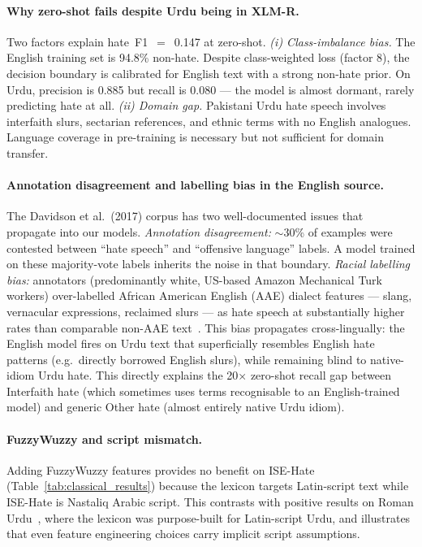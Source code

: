 \documentclass{article}
\begin{document}
\paragraph{Why zero-shot fails despite Urdu being in XLM-R.}
Two factors explain hate~F1~$=$~0.147 at zero-shot.
\textit{(i) Class-imbalance bias.}
The English training set is 94.8\% non-hate.
Despite class-weighted loss (factor 8), the decision boundary is
calibrated for English text with a strong non-hate prior.
On Urdu, precision is 0.885 but recall is 0.080 --- the model is
almost dormant, rarely predicting hate at all.
\textit{(ii) Domain gap.}
Pakistani Urdu hate speech involves interfaith slurs, sectarian references,
and ethnic terms with no English analogues.
Language coverage in pre-training is necessary but not sufficient for
domain transfer.

\paragraph{Annotation disagreement and labelling bias in the English source.}
The Davidson et al.\ (2017) corpus has two well-documented issues that
propagate into our models.
\textit{Annotation disagreement:} $\sim$30\% of examples were contested
between ``hate speech'' and ``offensive language'' labels.
A model trained on these majority-vote labels inherits the noise in that
boundary.
\textit{Racial labelling bias:} annotators (predominantly white, US-based
Amazon Mechanical Turk workers) over-labelled African American English (AAE)
dialect features --- slang, vernacular expressions, reclaimed slurs ---
as hate speech at substantially higher rates than comparable non-AAE
text~\citep{davidson2017automated}.
This bias propagates cross-lingually: the English model fires on Urdu text
that superficially resembles English hate patterns (e.g.\ directly
borrowed English slurs), while remaining blind to native-idiom Urdu hate.
This directly explains the 20$\times$ zero-shot recall gap between
Interfaith hate (which sometimes uses terms recognisable to an
English-trained model) and generic Other hate (almost entirely native
Urdu idiom).

\paragraph{FuzzyWuzzy and script mismatch.}
Adding FuzzyWuzzy features provides no benefit on ISE-Hate
(Table~\ref{tab:classical_results}) because the lexicon targets Latin-script
text while ISE-Hate is Nastaliq Arabic script.
This contrasts with positive results on Roman Urdu~\citep{ullah2024fuzzy},
where the lexicon was purpose-built for Latin-script Urdu, and illustrates
that even feature engineering choices carry implicit script assumptions.
\end{document}
